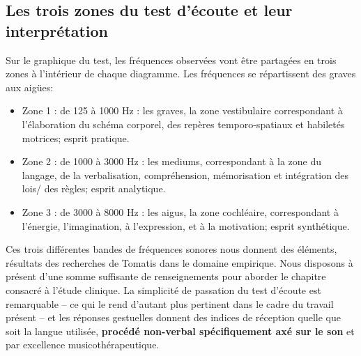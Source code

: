 \subsection{Les trois zones du test d'écoute et leur interprétation}
Sur le graphique du test, les fréquences observées vont être partagées en
trois zones à l\textquoteright intérieur
de chaque diagramme. Les fréquences se répartissent des
graves aux aigües:
\begin{itemize}
	\item Zone 1 : de 125 à 1000 Hz : les graves, la zone vestibulaire correspondant à l'élaboration
	du schéma corporel, des repères temporo-spatiaux et habiletés motrices; 
	esprit pratique.
	\item Zone 2 : de 1000 à 3000 Hz : les mediums, correspondant à  la zone du langage, de la
	verbalisation, compréhension, %
	mémorisation %
	et intégration des lois/
	des règles; esprit analytique.
	\item Zone 3 : de 3000 à 8000 Hz : les aigus, la zone cochléaire, correspondant à l'énergie,
	 l'imagination, à l'expression, et à la motivation; esprit synthétique.
	
\end{itemize}
Ces trois différentes bandes de fréquences sonores nous donnent des éléments, résultats des   
recherches de Tomatis dans le domaine
empirique. 
Nous disposons à présent d'une somme suffisante de renseignements pour
aborder le chapitre consacré à l'étude clinique.
La simplicité de
passation du test d'écoute est remarquable -- ce qui le rend d'autant
plus pertinent dans le cadre du travail présent -- et les réponses gestuelles
 donnent des indices de réception %
quelle que soit la langue utilisée,\textbf{ procédé non-verbal
spécifiquement axé sur le son} et par excellence musicothérapeutique.


